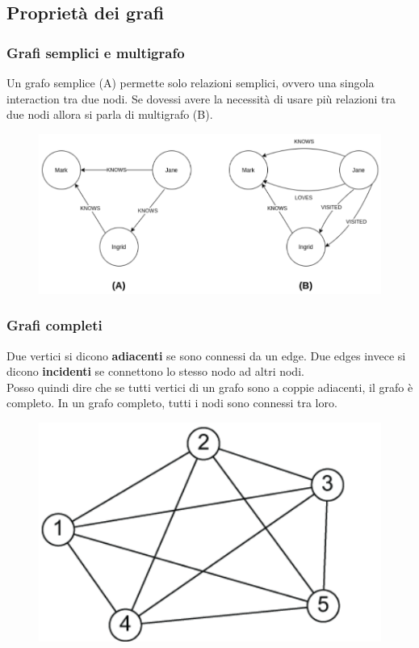 \subsection{Proprietà dei grafi}

\subsubsection*{Grafi semplici e multigrafo}

Un grafo semplice (A) permette solo relazioni semplici, ovvero una singola interaction tra due nodi. Se dovessi avere la necessità di usare più relazioni tra due nodi allora si parla di multigrafo (B). 
\\
\begin{figure}[th]
    \centering
    \includegraphics[scale=0.4]{Introduction/img/multigraph.png}
    \label{fig:multigraph}
\end{figure}

\subsubsection*{Grafi completi}

Due vertici si dicono \textbf{adiacenti} se sono connessi da un edge. Due edges invece si dicono \textbf{incidenti} se connettono lo stesso nodo ad altri nodi. 
\\
Posso quindi dire che se tutti vertici di un grafo sono a coppie adiacenti, il grafo è \textbf{}{completo}. In un grafo completo, tutti i nodi sono connessi tra loro. 
\\
\begin{figure}[th]
    \centering
    \includegraphics[scale=0.5]{Introduction/img/graphcomplete.png}
    \label{fig:complete}
\end{figure}


